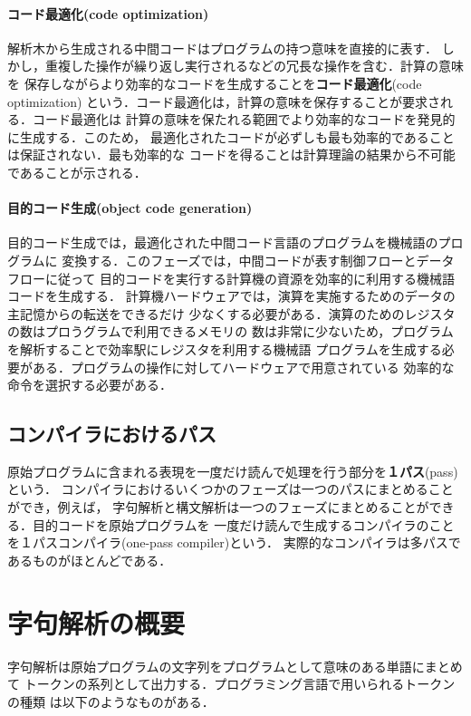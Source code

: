 \documentclass[a4j,dvipdfmx]{jbook}
\begin{document}
\paragraph{{\bf コード最適化}(code optimization)}
解析木から生成される中間コードはプログラムの持つ意味を直接的に表す．
しかし，重複した操作が繰り返し実行されるなどの冗長な操作を含む．計算の意味を
保存しながらより効率的なコードを生成することを{\bf コード最適化}(code optimization)
という．コード最適化は，計算の意味を保存することが要求される．コード最適化は
計算の意味を保たれる範囲でより効率的なコードを発見的に生成する．このため，
最適化されたコードが必ずしも最も効率的であることは保証されない．最も効率的な
コードを得ることは計算理論の結果から不可能であることが示される．
  
\paragraph{{\bf 目的コード生成}(object code generation)}
目的コード生成では，最適化された中間コード言語のプログラムを機械語のプログラムに
変換する．このフェーズでは，中間コードが表す制御フローとデータフローに従って
目的コードを実行する計算機の資源を効率的に利用する機械語コードを生成する．
計算機ハードウェアでは，演算を実施するためのデータの主記憶からの転送をできるだけ
少なくする必要がある．演算のためのレジスタの数はプロうグラムで利用できるメモリの
数は非常に少ないため，プログラムを解析することで効率駅にレジスタを利用する機械語
プログラムを生成する必要がある．プログラムの操作に対してハードウェアで用意されている
効率的な命令を選択する必要がある．

\subsection{コンパイラにおけるパス}
原始プログラムに含まれる表現を一度だけ読んで処理を行う部分を{\bf １パス}(pass)という．
コンパイラにおけるいくつかのフェーズは一つのパスにまとめることができ，例えば，
字句解析と構文解析は一つのフェーズにまとめることができる．目的コードを原始プログラムを
一度だけ読んで生成するコンパイラのことを１パスコンパイラ(one-pass compiler)という．
実際的なコンパイラは多パスであるものがほとんどである．

\section{字句解析の概要}

字句解析は原始プログラムの文字列をプログラムとして意味のある単語にまとめて
トークンの系列として出力する．プログラミング言語で用いられるトークンの種類
は以下のようなものがある．
\end{document}
